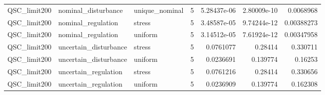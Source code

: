 \begin{tabular}{llllrrr}
QSC\_limit200 & nominal\_disturbance & unique\_nominal & 5 & 5.28437e-06 & 2.80009e-10 & 0.0068968 \\
QSC\_limit200 & nominal\_regulation & stress & 5 & 3.48587e-05 & 9.74244e-12 & 0.00388273 \\
QSC\_limit200 & nominal\_regulation & uniform & 5 & 3.14512e-05 & 7.61924e-12 & 0.00347958 \\
QSC\_limit200 & uncertain\_disturbance & stress & 5 & 0.0761077 & 0.28414 & 0.330711 \\
QSC\_limit200 & uncertain\_disturbance & uniform & 5 & 0.0236691 & 0.139774 & 0.16253 \\
QSC\_limit200 & uncertain\_regulation & stress & 5 & 0.0761216 & 0.28414 & 0.330656 \\
QSC\_limit200 & uncertain\_regulation & uniform & 5 & 0.0236909 & 0.139774 & 0.162308 \\
\hline
\end{tabular}
